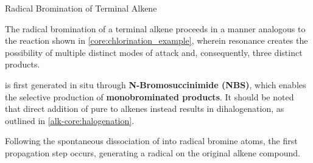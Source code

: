     \begin{core}{Radical Bromination of Terminal Alkene}

      The radical bromination of a terminal alkene proceeds in a manner analogous to the reaction shown in \autoref{core:chlorination_example}, wherein resonance creates the possibility of multiple distinct modes of attack and, consequently, three distinct products.

       is first generated in situ through \textbf{N-Bromosuccinimide (NBS)}, which enables the selective production of \textbf{monobrominated products}. It should be noted that direct addition of pure  to alkenes instead results in dihalogenation, as outlined in \autoref{alk-core:halogenation}.

      \vspace{-0.2cm}

      Following the spontaneous dissociation of  into radical bromine atoms, the first propagation step occurs, generating a radical on the original alkene compound.



\end{core}

